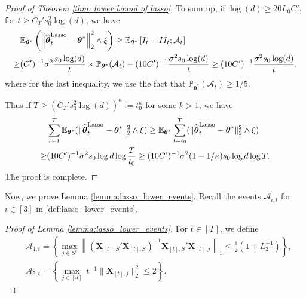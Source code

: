 \documentclass[aos,preprint]{imsart}
\theoremstyle{plain}
\theoremstyle{definition}
\newcommand{\btheta}{\boldsymbol{\theta}}
\newcommand{\hbtheta}{\widehat{\boldsymbol{\theta}}}
\newcommand{\bX}{\boldsymbol{X}}
\newcommand{\ltheta}{\hbtheta^{\textup{Lasso}}}
\newcommand{\cA}{\mathcal{A}}
\newcommand{\Exp}{\mathbb{E}}
\newcommand{\Pro}{\mathbb{P}}
\begin{document}
\begin{appendix}
\begin{proof}[Proof of Theorem \ref{thm: lower bound of lasso}]
To sum up, if $\log(d) \geq 20L_0 C'$, for $t \geq C_{T}'s_0^2 \log(d)$, we have
\begin{align*}
   & \Exp_{\btheta^*}\left(\left\|\ltheta_t-\btheta^*\right\|_2^2 \wedge \xi \right)\ge \Exp_{\btheta^*}\left[I_t - II_t ; \cA_t \right] \\
    \geq & (C')^{-1} \sigma^2 \frac{s_0\log(d)}{t} \times \Pro_{\btheta^*}(\cA_t) - (10C')^{-1} \frac{\sigma^2 s_0\log(d)}{t} \geq (10C')^{-1} \frac{\sigma^2 s_0\log(d)}{t},
\end{align*}
where for the last inequality, we use the fact that $\Pro_{\btheta^*}(\cA_t) \geq 1/5$.

Thus if $T \geq (C_{T}'s_0^2 \log(d))^{\kappa} := t_0^{\kappa}$ for some $k > 1$, we have
\begin{align*}
&\sum_{t=1}^T \Exp_{\btheta^*} (\|\ltheta_t-\btheta^*\|_2^2  \wedge \xi) \ge \Exp_{\btheta^*} \sum_{t=t_0}^T (\|\ltheta_t-\btheta^*\|_2^2 \wedge \xi) \\
\ge &(10C')^{-1}\sigma^2 s_0\log d\log \frac{T}{t_0}
\ge (10C')^{-1}\sigma^2 (1-1/\kappa)s_0 \log d\log T.
\end{align*}
The proof is complete.
\end{proof}

Now, we prove Lemma \ref{lemma:lasso_lower_events}. Recall the events $\cA_{i,t}$ for $i \in [3]$ in \eqref{def:lasso_lower_events}.

\begin{proof}[Proof of Lemma \ref{lemma:lasso_lower_events}]
 For $t \in [T]$, we define \begin{equation*}%
\begin{aligned}
& \mathcal{A}_{4,t}=\left\{ \max_{j\in{S^c}}\left\| \left(\bX_{[t],S}'\bX_{[t],S}\right)^{-1} \bX_{[t],S}' \bX_{[t],j}\right\|_1    \le\frac{1}{2}(1+ L_2^{-1})    \right\},
\\&\mathcal{A}_{5,t}=\left\{\max_{j\in [d]}\ t^{-1}\|\bX_{[t],j}\|_2^2\le 2\right\}.
\end{aligned}
\end{equation*}



\end{proof}
\end{appendix}
\end{document}
